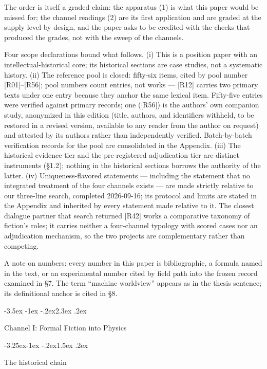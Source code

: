 \documentclass[11pt,a4paper]{article}
\makeatletter
\renewcommand\section{\@startsection{section}{1}{\z@}%
  {-3.5ex \@plus -1ex \@minus -.2ex}{2.3ex \@plus .2ex}%
  {\normalfont\Large\bfseries\raggedright}}
\renewcommand\subsection{\@startsection{subsection}{2}{\z@}%
  {-3.25ex\@plus -1ex \@minus -.2ex}{1.5ex \@plus .2ex}%
  {\normalfont\large\bfseries\raggedright}}
\makeatother
\begin{document}
The order is itself a graded claim: the apparatus (1) is what this paper would be missed for; the channel readings (2) are its first application and are graded at the supply level by design, and the paper asks to be credited with the checks that produced the grades, not with the sweep of the channels.

Four scope declarations bound what follows. (i) This is a position paper with an intellectual-historical core; its historical sections are case studies, not a systematic history. (ii) The reference pool is closed: fifty-six items, cited by pool number [R01]–[R56]; pool numbers count entries, not works — [R12] carries two primary texts under one entry because they anchor the same lexical item. Fifty-five entries were verified against primary records; one ([R56]) is the authors' own companion study, anonymized in this edition (title, authors, and identifiers withheld, to be restored in a revised version, available to any reader from the author on request) and attested by its authors rather than independently verified. Batch-by-batch verification records for the pool are consolidated in the Appendix. (iii) The historical evidence tier and the pre-registered adjudication tier are distinct instruments (§1.2); nothing in the historical sections borrows the authority of the latter. (iv) Uniqueness-flavored statements — including the statement that no integrated treatment of the four channels exists — are made strictly relative to our three-line search, completed 2026-09-16; its protocol and limits are stated in the Appendix and inherited by every statement made relative to it. The closest dialogue partner that search returned [R42] works a comparative taxonomy of fiction's roles; it carries neither a four-channel typology with scored cases nor an adjudication mechanism, so the two projects are complementary rather than competing.

A note on numbers: every number in this paper is bibliographic, a formula named in the text, or an experimental number cited by field path into the frozen record examined in §7. The term ``machine worldview'' appears as in the thesis sentence; its definitional anchor is cited in §8.

\section{Channel I: Formal Fiction into Physics}

\subsection{The historical chain}
\end{document}
